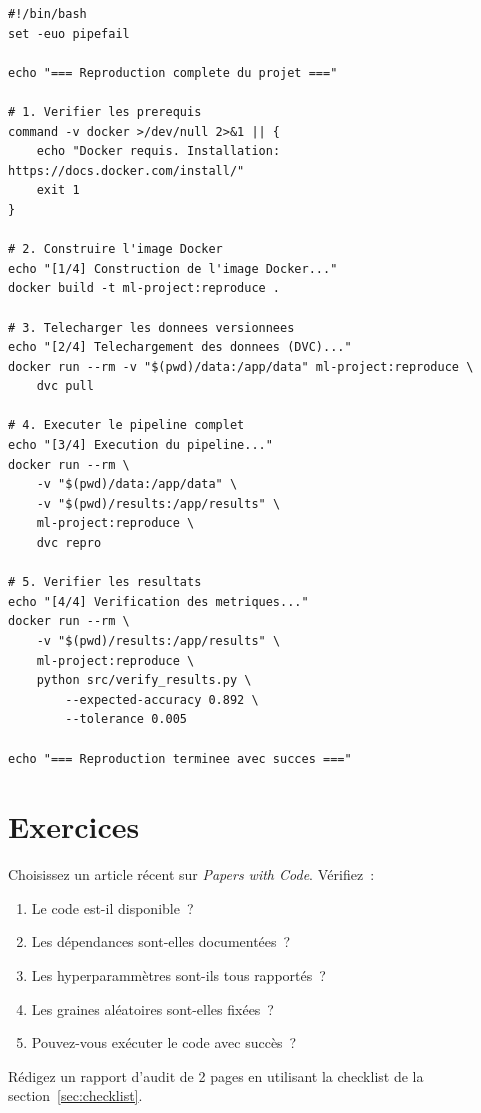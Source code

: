 \begin{codeblock}[title=\textbf{reproduce.sh --- Script de reproduction compl\`ete}]
\begin{verbatim}
#!/bin/bash
set -euo pipefail

echo "=== Reproduction complete du projet ==="

# 1. Verifier les prerequis
command -v docker >/dev/null 2>&1 || {
    echo "Docker requis. Installation: https://docs.docker.com/install/"
    exit 1
}

# 2. Construire l'image Docker
echo "[1/4] Construction de l'image Docker..."
docker build -t ml-project:reproduce .

# 3. Telecharger les donnees versionnees
echo "[2/4] Telechargement des donnees (DVC)..."
docker run --rm -v "$(pwd)/data:/app/data" ml-project:reproduce \
    dvc pull

# 4. Executer le pipeline complet
echo "[3/4] Execution du pipeline..."
docker run --rm \
    -v "$(pwd)/data:/app/data" \
    -v "$(pwd)/results:/app/results" \
    ml-project:reproduce \
    dvc repro

# 5. Verifier les resultats
echo "[4/4] Verification des metriques..."
docker run --rm \
    -v "$(pwd)/results:/app/results" \
    ml-project:reproduce \
    python src/verify_results.py \
        --expected-accuracy 0.892 \
        --tolerance 0.005

echo "=== Reproduction terminee avec succes ==="
\end{verbatim}
\end{codeblock}

\section{Exercices}
\label{sec:exercises-ch11}

\begin{exercice}[$\bigstar$ --- Audit de reproductibilit\'e]
Choisissez un article r\'ecent sur \emph{Papers with Code}. V\'erifiez~:
\begin{enumerate}
  \item Le code est-il disponible~?
  \item Les d\'ependances sont-elles document\'ees~?
  \item Les hyperparamm\`etres sont-ils tous rapport\'es~?
  \item Les graines al\'eatoires sont-elles fix\'ees~?
  \item Pouvez-vous ex\'ecuter le code avec succ\`es~?
\end{enumerate}
R\'edigez un rapport d'audit de 2 pages en utilisant la checklist de la
section~\ref{sec:checklist}.
\end{exercice}

